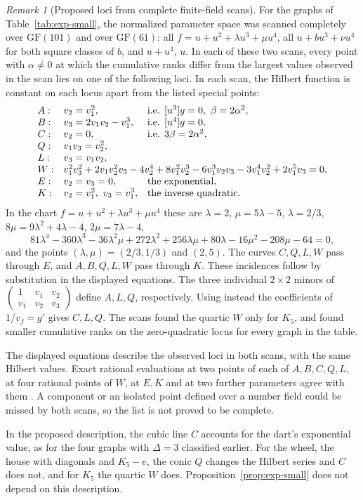 \documentclass[reqno]{article}
\theoremstyle{plain} %
\theoremstyle{definition}
\theoremstyle{remark}
\newtheorem{remark}[theorem]{\sc Remark}
\numberwithin{equation}{section}
\begin{document}
\begin{remark}[Proposed loci from complete finite-field scans]
\label{rem:D4-small-strata}
For the graphs of Table~\ref{tab:exp-small}, the normalized parameter
space was scanned completely over $\mathrm{GF}(101)$ and over
$\mathrm{GF}(61)$: all $f=u+u^2+\lambda u^3+\mu u^4$, all
$u+bu^3+\nu u^4$ for both square classes of $b$, and $u+u^4$, $u$.
In each of these two scans, every point with $\alpha\ne0$ at which the
cumulative ranks differ from the largest values observed in the scan
lies on one of the following loci. In each scan, the Hilbert function
is constant on each locus apart from the listed special points:
\[
\begin{array}{lll}
A:& v_2=v_1^2, & \text{i.e. } [u^3]g=0,\ \beta=2\alpha^2,\\
B:& v_3=2v_1v_2-v_1^3, & \text{i.e. } [u^4]g=0,\\
C:& v_2=0, & \text{i.e. } 3\beta=2\alpha^2,\\
Q:& v_1v_3=v_2^2,&\\
L:& v_3=v_1v_2,&\\
W:& \multicolumn{2}{l}{v_1^2v_3^2+2v_1v_2^2v_3-4v_2^4+8v_1^2v_2^3
     -6v_1^3v_2v_3-3v_1^4v_2^2+2v_1^5v_3=0,}\\
E:& v_2=v_3=0,& \text{the exponential},\\
K:& v_2=v_1^2,\ v_3=v_1^3,& \text{the inverse quadratic}.
\end{array}
\]
In the chart $f=u+u^2+\lambda u^3+\mu u^4$ these are $\lambda=2$,
$\mu=5\lambda-5$, $\lambda=2/3$, $8\mu=9\lambda^2+4\lambda-4$,
$2\mu=7\lambda-4$,
\[
81\lambda^4-360\lambda^3-36\lambda^2\mu+272\lambda^2+256\lambda\mu
+80\lambda-16\mu^2-208\mu-64=0,
\]
and the points $(\lambda,\mu)=(2/3,1/3)$ and $(2,5)$. The curves $C,Q,L,W$ pass through $E$, and $A,B,Q,L,W$ pass through
$K$. These incidences follow by substitution in the displayed equations.
The three individual $2\times2$ minors of
$\left(\begin{smallmatrix}1&v_1&v_2\\v_1&v_2&v_3\end{smallmatrix}\right)$
define $A,L,Q$, respectively. Using instead the coefficients of
$1/v_f=g'$ gives $C,L,Q$.
The scans found the quartic $W$ only for $K_5$, and found smaller
cumulative ranks on the zero-quadratic locus for every graph in the table.

The displayed equations describe the observed loci in both scans, with
the same Hilbert values. Exact rational evaluations at two points of each of $A,B,C,Q,L$, at four rational points
of $W$, at $E,K$ and at two further parameters agree with them
\cite[\texttt{search/exp\_small.py}]{Cert}. A component or an isolated
point defined over a number field could be missed by both scans, so the
list is not proved to be complete.

In the proposed description, the cubic line $C$ accounts for the dart's
exponential value, as for the four graphs with $\Delta=3$ classified
earlier. For the wheel, the house with diagonals and $K_5-e$, the conic $Q$ changes
the Hilbert series and $C$ does not, and for $K_5$ the quartic $W$ does.
Proposition~\ref{prop:exp-small} does not depend on this description.
\end{remark}
\end{document}
